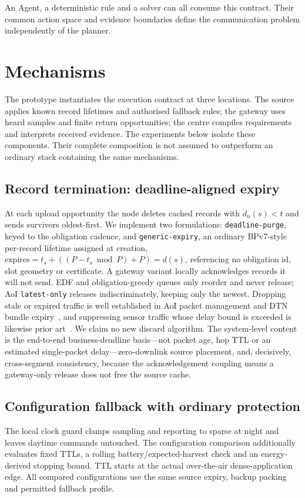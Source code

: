 \documentclass[journal,10pt]{IEEEtran}
\begin{document}
An Agent, a deterministic rule and a solver can all consume this contract. Their common action
space and evidence boundaries define the communication problem independently of the planner.

\section{Mechanisms}
\label{sec:mech}
The prototype instantiates the execution contract at three locations. The source applies known
record lifetimes and authorised fallback rules; the gateway uses heard samples and finite return
opportunities; the centre compiles requirements and interprets received evidence. The experiments
below isolate these components. Their complete composition is not assumed to outperform an
ordinary stack containing the same mechanisms.

\subsection{Record termination: deadline-aligned expiry}
\label{sec:mech-record}
At each upload opportunity the node deletes cached records with $d_n(s)<t$ and sends survivors
oldest-first. We implement two formulations: \texttt{deadline-purge}, keyed to the obligation
cadence, and \texttt{generic-expiry}, an ordinary BPv7-style per-record lifetime assigned at
creation, $\text{expires}=t_s+((P-t_s\bmod P)+P)=d(s)$, referencing no obligation id, slot
geometry or certificate. A gateway variant locally acknowledges records it will not send. EDF and
obligation-greedy queues only reorder and never release; AoI \texttt{latest-only} releases
indiscriminately, keeping only the newest. Dropping stale or expired traffic is well established
in AoI packet management and DTN bundle expiry~\cite{costa2014pm,kam2016deadline,dtnarch,rfc9171},
and suppressing sensor traffic whose delay bound is exceeded is likewise prior
art~\cite{wada2009timeout}. We claim no new discard algorithm. The system-level content is the
end-to-end business-deadline basis---not packet age, hop TTL or an estimated single-packet
delay---zero-downlink source placement, and, decisively, cross-segment consistency, because the
acknowledgement coupling means a gateway-only release does not free the source cache.

\subsection{Configuration fallback with ordinary protection}
\label{sec:mech-lease}
The local clock guard clamps sampling and reporting to sparse at night and leaves daytime
commands untouched. The configuration comparison additionally evaluates fixed TTLs, a rolling
battery/expected-harvest check and an energy-derived stopping bound. TTL starts at the actual
over-the-air dense-application edge. All compared configurations use the same source expiry,
backup packing and permitted fallback profile.
\end{document}
